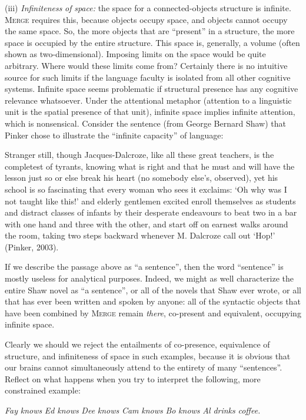 (iii) \textit{Infiniteness} \textit{of} \textit{space:} the space for a connected-objects structure is infinite. \textsc{Merge} requires this, because objects occupy space, and objects cannot occupy the same space. So, the more objects that are “present” in a structure, the more space is occupied by the entire structure. This space is, generally, a volume (often shown as two-dimensional). Imposing limits on the space would be quite arbitrary. Where would these limits come from? Certainly there is no intuitive source for such limits if the language faculty is isolated from all other cognitive systems. Infinite space seems problematic if structural presence has any cognitive relevance whatsoever. Under the attentional metaphor (attention to a linguistic unit is the spatial presence of that unit), infinite space implies infinite attention, which is nonsensical. Consider the sentence (from George Bernard Shaw) that Pinker chose to illustrate the “infinite capacity” of language:

Stranger still, though Jacques-Dalcroze, like all these great teachers, is the completest of tyrants, knowing what is right and that he must and will have the lesson just so or else break his heart (no somebody else’s, observed), yet his school is so fascinating that every woman who sees it exclaims: ‘Oh why was I not taught like this!’ and elderly gentlemen excited enroll themselves as students and distract classes of infants by their desperate endeavours to beat two in a bar with one hand and three with the other, and start off on earnest walks around the room, taking two steps backward whenever M. Dalcroze call out ‘Hop!’ (Pinker, 2003).

  If we describe the passage above as “a sentence”, then the word “sentence” is mostly useless for analytical purposes. Indeed, we might as well characterize the entire Shaw novel as “a sentence”, or all of the novels that Shaw ever wrote, or all that has ever been written and spoken by anyone: all of the syntactic objects that have been combined by \textsc{Merge} remain \textit{there}, co-present and equivalent, occupying infinite space. 

  Clearly we should we reject the entailments of co-presence, equivalence of structure, and infiniteness of space in such examples, because it is obvious that our brains cannot simultaneously attend to the entirety of many “sentences”. Reflect on what happens when you try to interpret the following, more constrained example:

    \textit{Fay} \textit{knows} \textit{Ed} \textit{knows} \textit{Dee} \textit{knows} \textit{Cam} \textit{knows} \textit{Bo} \textit{knows} \textit{Al} \textit{drinks} \textit{coffee.}

